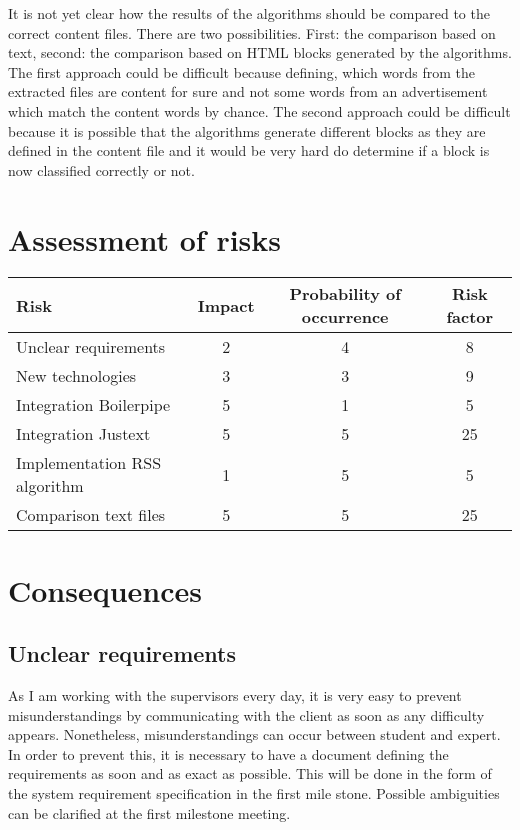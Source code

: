 It is not yet clear how the results of the algorithms should be compared to the correct content files. There are two possibilities. First: the comparison based on text, second: the comparison based on HTML blocks generated by the algorithms. 
The first approach could be difficult because defining, which words from the extracted files are content for sure and not some words from an advertisement which match the content words by chance.
The second approach could be difficult because it is possible that the algorithms generate different blocks as they are defined in the content file and it would be very hard do determine if a block is now classified correctly or not.

\section{Assessment of risks}

\begin{table}[h]
\begin{tabular}{|l|c|c|c|}
\hline
\textbf{Risk} & \textbf{Impact} & \textbf{Probability of occurrence} & \textbf{Risk factor} \\ \hline
Unclear requirements & 2 & 4 & 8\\ \hline
New technologies & 3 & 3 & 9 \\ \hline
Integration Boilerpipe & 5 & 1 & 5\\ \hline
Integration Justext & 5 & 5 & 25 \\ \hline
Implementation RSS algorithm & 1 & 5 & 5\\ \hline
Comparison text files & 5 & 5 & 25 \\ \hline
\end{tabular}
\end{table}

\section{Consequences}



\subsection{Unclear requirements}

As I am working with the supervisors every day, it is very easy to prevent misunderstandings by communicating with the client as soon as any difficulty appears. Nonetheless, misunderstandings can occur between student and expert. In order to prevent this, it is necessary to have a document defining the requirements as soon and as exact as possible. This will be done in the form of the system requirement specification in the first mile stone. Possible ambiguities can be clarified at the first milestone meeting.

